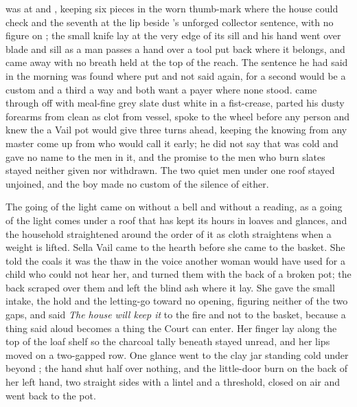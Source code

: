  was at  and , keeping six pieces in the worn thumb-mark where the house could check and the seventh at the lip beside 's unforged collector sentence, with no figure on ; the small knife lay at the very edge of its sill and his hand went over blade and sill as a man passes a hand over a tool put back where it belongs, and came away with no breath held at the top of the reach. The sentence he had said in the morning was found where put and not said again, for a second would be a custom and a third a way and both want a payer where none stood.  came through  off  with meal-fine grey slate dust white in a fist-crease, parted his dusty forearms from clean as clot from vessel, spoke to the wheel before any person and knew the  a Vail pot would give three turns ahead, keeping the knowing from any master come up from  who would call it early; he did not say that  was cold and gave no name to the men in it, and the promise to the men who burn slates stayed neither given nor withdrawn. The two quiet men under one roof stayed unjoined, and the boy made no custom of the silence of either.

\scenebreak

The going of the light came on without a bell and without a reading, as a going of the light comes under a roof that has kept its hours in loaves and glances, and the household straightened around the order of it as cloth straightens when a weight is lifted. Sella Vail came to the hearth before she came to the basket. She told the coals it was the thaw in the voice another woman would have used for a child who could not hear her, and turned them with the back of a broken pot; the back scraped over them and left the blind ash where it lay. She gave the small intake, the hold and the letting-go toward no opening, figuring neither of the two gaps, and said \emph{The house will keep it} to the fire and not to the basket, because a thing said aloud becomes a thing the Court can enter. Her finger lay along the top of the loaf shelf so the charcoal tally beneath stayed unread, and her lips moved on a two-gapped row. One glance went to the clay jar standing cold under  beyond ; the hand shut half over nothing, and the little-door burn on the back of her left hand, two straight sides with a lintel and a threshold, closed on air and went back to the pot.


